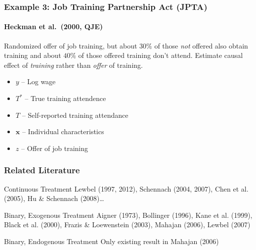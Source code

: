 \documentclass{beamer}
\begin{document}
\begin{frame}
  \frametitle{Example 3: Job Training Partnership Act (JPTA)}
\framesubtitle{Heckman et al.\ (2000, QJE)}
Randomized offer of job training, but about $30\%$ of those \emph{not} offered also obtain training and about $40\%$ of those offered training don't attend. Estimate causal effect of \emph{training} rather than \emph{offer} of training.

\begin{itemize}
  \item $y$ -- Log wage 
  \item $T^*$ -- True training attendence
  \item $T$ -- Self-reported training attendance
  \item $\mathbf{x}$ -- Individual characteristics
  \item $z$ -- Offer of job training
\end{itemize}
   
\end{frame}
\begin{frame}
  \frametitle{Related Literature}
 
  \begin{block}{Continuous Treatment}
    \small
  Lewbel (1997, 2012), Schennach (2004, 2007), Chen et al. (2005), Hu \& Schennach (2008)\dots 
  \end{block}

  \begin{block}{Binary, Exogenous Treatment}
    \small
   Aigner (1973), Bollinger (1996), Kane et al. (1999), Black et al. (2000), Frazis \& Loewenstein (2003), Mahajan (2006), Lewbel (2007) 
  \end{block}

  \begin{alertblock}{Binary, Endogenous Treatment}
    Only existing result in Mahajan (2006)
  \end{alertblock}
\end{frame}
\end{document}
